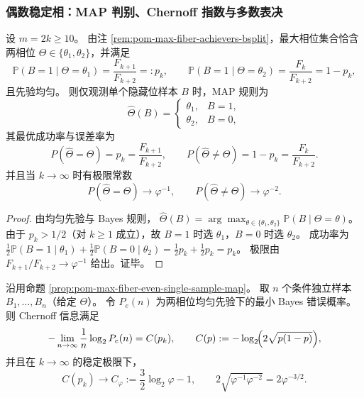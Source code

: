 \subsubsection{偶数稳定相：MAP 判别、Chernoff 指数与多数表决}

\begin{proposition}\label{prop:pom-max-fiber-even-single-sample-map}
设 \(m=2k\ge 10\)。
由注 \ref{rem:pom-max-fiber-achievers-bsplit}，最大相位集合恰含两相位 \(\Theta\in\{\theta_1,\theta_2\}\)，并满足
\[
\mathbb{P}(B=1\mid \Theta=\theta_1)=\frac{F_{k+1}}{F_{k+2}}=:p_k,\qquad
\mathbb{P}(B=1\mid \Theta=\theta_2)=\frac{F_{k}}{F_{k+2}}=1-p_k,
\]
且先验均匀。
则仅观测单个隐藏位样本 \(B\) 时，MAP 规则为
\[
\widehat\Theta(B)=
\begin{cases}
\theta_1,& B=1,\\
\theta_2,& B=0,
\end{cases}
\]
其最优成功率与误差率为
\[
P(\widehat\Theta=\Theta)=p_k=\frac{F_{k+1}}{F_{k+2}},\qquad
P(\widehat\Theta\neq\Theta)=1-p_k=\frac{F_{k}}{F_{k+2}}.
\]
并且当 \(k\to\infty\) 时有极限常数
\[
P(\widehat\Theta=\Theta)\to \varphi^{-1},\qquad
P(\widehat\Theta\neq\Theta)\to \varphi^{-2}.
\]
\end{proposition}

\begin{proof}
由均匀先验与 Bayes 规则，
\(
\widehat\Theta(B)=\arg\max_{\theta\in\{\theta_1,\theta_2\}}\mathbb{P}(B\mid\Theta=\theta)
\)。
由于 \(p_k>1/2\)（对 \(k\ge 1\) 成立），故 \(B=1\) 时选 \(\theta_1\)，\(B=0\) 时选 \(\theta_2\)。
成功率为
\(
\frac12\mathbb{P}(B=1\mid\theta_1)+\frac12\mathbb{P}(B=0\mid\theta_2)=\frac12 p_k+\frac12 p_k=p_k
\)。
极限由 \(F_{k+1}/F_{k+2}\to \varphi^{-1}\) 给出。证毕。
\end{proof}

\begin{theorem}\label{thm:pom-max-fiber-even-chernoff-exponent}
沿用命题 \ref{prop:pom-max-fiber-even-single-sample-map}。
取 \(n\) 个条件独立样本 \(B_1,\dots,B_n\)（给定 \(\Theta\)）。
令 \(P_e(n)\) 为两相位均匀先验下的最小 Bayes 错误概率。
则 Chernoff 信息满足
\[
-\lim_{n\to\infty}\frac{1}{n}\log_2 P_e(n)=C(p_k),
\qquad
C(p):=-\log_2\!\Bigl(2\sqrt{p(1-p)}\Bigr),
\]
并且在 \(k\to\infty\) 的稳定极限下，
\[
\boxed{\;
C(p_k)\to C_\varphi:=\frac32\log_2\varphi-1,\qquad
2\sqrt{\varphi^{-1}\varphi^{-2}}=2\varphi^{-3/2}. \;}
\]
\end{theorem}

